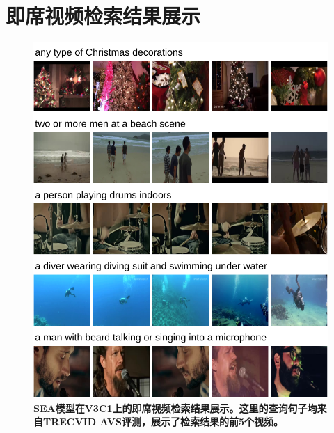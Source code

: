 \chapter{即席视频检索结果展示} \label{app:app-a}
\begin{figure}[tbh!]
    \centering
    \includegraphics[width=\linewidth]{figures/search_result_1}
    \caption[SEA模型在V3C1上的即席视频检索结果展示]{\textbf{SEA模型在V3C1上的即席视频检索结果展示。这里的查询句子均来自TRECVID AVS评测，展示了检索结果的前5个视频。}}
    \label{fig:search_result_1}
\end{figure}

